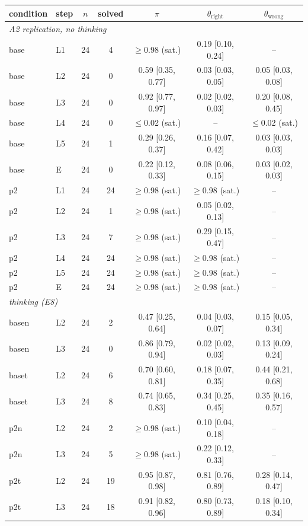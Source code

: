 \begin{tabular}{llccccc}
\toprule
condition & step & $n$ & solved & $\pi$ & $\theta_{\text{right}}$ & $\theta_{\text{wrong}}$ \\
\midrule
\multicolumn{7}{l}{\emph{A2 replication, no thinking}} \\
base & L1 & 24 & 4 & $\geq$0.98 (sat.) & 0.19 [0.10, 0.24] & -- \\
base & L2 & 24 & 0 & 0.59 [0.35, 0.77] & 0.03 [0.03, 0.05] & 0.05 [0.03, 0.08] \\
base & L3 & 24 & 0 & 0.92 [0.77, 0.97] & 0.02 [0.02, 0.03] & 0.20 [0.08, 0.45] \\
base & L4 & 24 & 0 & $\leq$0.02 (sat.) & -- & $\leq$0.02 (sat.) \\
base & L5 & 24 & 1 & 0.29 [0.26, 0.37] & 0.16 [0.07, 0.42] & 0.03 [0.03, 0.03] \\
base & E & 24 & 0 & 0.22 [0.12, 0.33] & 0.08 [0.06, 0.15] & 0.03 [0.02, 0.03] \\
p2 & L1 & 24 & 24 & $\geq$0.98 (sat.) & $\geq$0.98 (sat.) & -- \\
p2 & L2 & 24 & 1 & $\geq$0.98 (sat.) & 0.05 [0.02, 0.13] & -- \\
p2 & L3 & 24 & 7 & $\geq$0.98 (sat.) & 0.29 [0.15, 0.47] & -- \\
p2 & L4 & 24 & 24 & $\geq$0.98 (sat.) & $\geq$0.98 (sat.) & -- \\
p2 & L5 & 24 & 24 & $\geq$0.98 (sat.) & $\geq$0.98 (sat.) & -- \\
p2 & E & 24 & 24 & $\geq$0.98 (sat.) & $\geq$0.98 (sat.) & -- \\
\multicolumn{7}{l}{\emph{thinking (E8)}} \\
basen & L2 & 24 & 2 & 0.47 [0.25, 0.64] & 0.04 [0.03, 0.07] & 0.15 [0.05, 0.34] \\
basen & L3 & 24 & 0 & 0.86 [0.79, 0.94] & 0.02 [0.02, 0.03] & 0.13 [0.09, 0.24] \\
baset & L2 & 24 & 6 & 0.70 [0.60, 0.81] & 0.18 [0.07, 0.35] & 0.44 [0.21, 0.68] \\
baset & L3 & 24 & 8 & 0.74 [0.65, 0.83] & 0.34 [0.25, 0.45] & 0.35 [0.16, 0.57] \\
p2n & L2 & 24 & 2 & $\geq$0.98 (sat.) & 0.10 [0.04, 0.18] & -- \\
p2n & L3 & 24 & 5 & $\geq$0.98 (sat.) & 0.22 [0.12, 0.33] & -- \\
p2t & L2 & 24 & 19 & 0.95 [0.87, 0.98] & 0.81 [0.76, 0.89] & 0.28 [0.14, 0.47] \\
p2t & L3 & 24 & 18 & 0.91 [0.82, 0.96] & 0.80 [0.73, 0.89] & 0.18 [0.10, 0.34] \\

\end{tabular}
